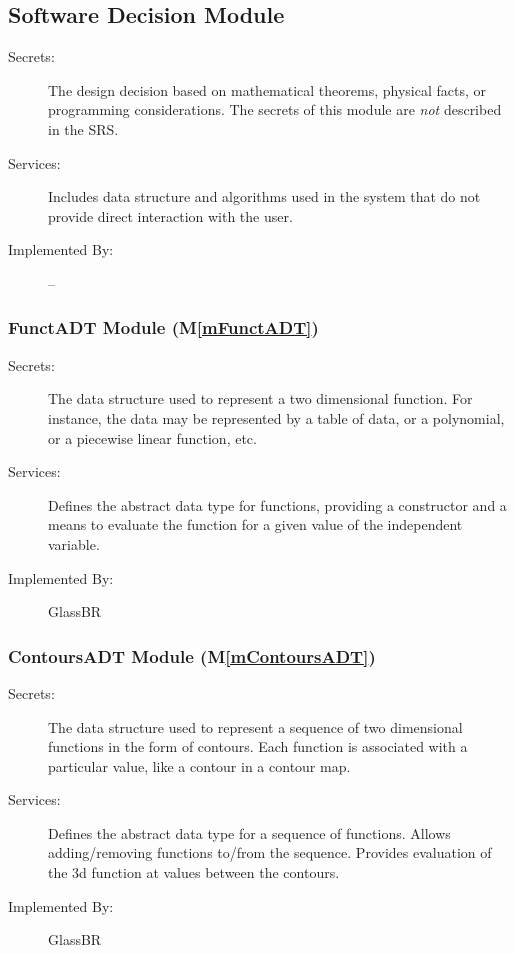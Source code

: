 \documentclass[12pt]{article}
\newcommand{\mref}[1]{M\ref{#1}}
\newcommand{\progname}{GlassBR}
\begin{document}
\subsection{Software Decision Module}

\begin{description}
\item[Secrets:] The design decision based on mathematical theorems, physical
  facts, or programming considerations. The secrets of this module are
  \emph{not} described in the SRS.
\item[Services:] Includes data structure and algorithms used in the system that
  do not provide direct interaction with the user. 
\item[Implemented By:] --
\end{description}

\subsubsection{FunctADT Module (\mref{mFunctADT})}

\begin{description}
\item[Secrets:] The data structure used to represent a two dimensional
  function.  For instance, the data may be represented by a table of data, or a
  polynomial, or a piecewise linear function, etc.
\item[Services:] Defines the abstract data type for functions, providing a
  constructor and a means to evaluate the function for a given value of the
  independent variable.
\item[Implemented By:] \progname{}
\end{description}

\subsubsection{ContoursADT Module (\mref{mContoursADT})}

\begin{description}
\item[Secrets:] The data structure used to represent a
  sequence of two dimensional functions in the form of contours.  Each function
  is associated with a particular value, like a contour in a contour map.
\item[Services:] Defines the abstract data type for a sequence of functions.
  Allows adding/removing functions to/from the sequence.  Provides evaluation of
  the 3d function at values between the contours.
\item[Implemented By:] \progname{}
\end{description}
\end{document}

